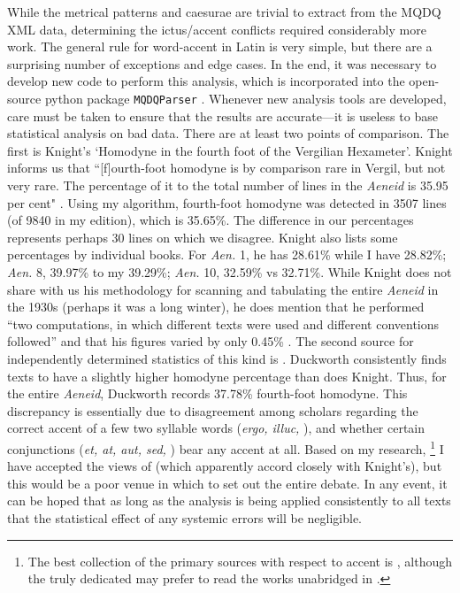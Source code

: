 \documentclass[11pt,a4paper]{scrartcl} %
\begin{document}
{While the metrical patterns and caesurae are trivial to extract from the MQDQ XML data, determining the ictus/accent conflicts required considerably more work. The general rule for word-accent in Latin is very simple, but there are a surprising number of exceptions and edge cases. In the end, it was necessary to develop new code to perform this analysis, which is incorporated into the open-source python package \texttt{MQDQParser} \cite{nagy_mqdq_2019}. Whenever new analysis tools are developed, care must be taken to ensure that the results are accurate---it is useless to base statistical analysis on bad data. There are at least two points of comparison. The first is Knight's `Homodyne in the fourth foot of the Vergilian Hexameter'. Knight informs us that ``[f]ourth-foot homodyne is by comparison rare in Vergil, but not very rare. The percentage of it to the total number of lines in the \textit{Aeneid} is 35.95 per cent" \cite[186]{knight_homodyne_1931}. Using my algorithm, fourth-foot homodyne was detected in 3507 lines (of 9840 in my edition), which is 35.65\%. The difference in our percentages represents perhaps 30 lines on which we disagree. Knight also lists some percentages by individual books. For \textit{Aen.} 1, he has 28.61\% while I have 28.82\%; \textit{Aen.} 8, 39.97\% to my 39.29\%; \textit{Aen.} 10, 32.59\% vs 32.71\%. While Knight does not share with us his methodology for scanning and tabulating the entire \textit{Aeneid} in the 1930s (perhaps it was a long winter), he does mention that he performed ``two computations, in which different texts were used and different conventions followed'' and that his figures varied by only 0.45\% \cite[186 n. 1]{knight_homodyne_1931}. The second source for independently determined statistics of this kind is . Duckworth consistently finds texts to have a slightly higher homodyne percentage than does Knight. Thus, for the entire \textit{Aeneid}, Duckworth records 37.78\% fourth-foot homodyne. This discrepancy is essentially due to disagreement among scholars regarding the correct accent of a few two syllable words (\textit{ergo, illuc,} \textellipsis), and whether certain conjunctions (\textit{et, at, aut, sed,} \textellipsis) bear any accent at all. Based on my research,%
\footnote{The best collection of the primary sources with respect to accent is \cite{schoell_accentu_1876}, although the truly dedicated may prefer to read the works unabridged in \cite{keil_heinrich_grammatici_1857}.}
I have accepted the views of  (which apparently accord closely with Knight's), but this would be a poor venue in which to set out the entire debate. In any event, it can be hoped that as long as the analysis is being applied consistently to all texts that the statistical effect of any systemic errors will be negligible.

}
\end{document}
